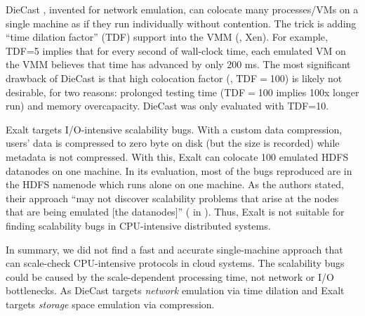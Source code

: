 %
DieCast \cite{Gupta+08-DieCast}, invented for network emulation, can colocate
many processes/VMs on a single machine as if they run individually without
contention.  The trick is adding ``time dilation factor'' (TDF) support
\cite{Gupta+06-TimeDilation} into the VMM (\eg, Xen).
%
For example, TDF=5 implies that for every second of wall-clock time, each
emulated VM on the VMM believes that time has advanced by only 200 ms.
%
The most significant drawback of DieCast is that high colocation factor (\eg,
TDF$=$100) is likely not desirable, for two reasons: prolonged testing time
(TDF$=$100 implies 100x longer run) and memory overcapacity.  DieCast was only
evaluated with TDF=10.


Exalt \cite{Wang+14-Exalt} targets I/O-intensive scalability bugs.  With a
custom data compression, users' data is compressed to zero byte on disk (but the
size is recorded) while metadata is not compressed.  With this, Exalt can
colocate 100 emulated HDFS datanodes on one machine.  In its evaluation, most
of the bugs reproduced are in the HDFS namenode which runs alone on one machine.
As the authors stated, their approach ``may not discover scalability problems
that arise at the nodes that are being emulated [the datanodes]'' ( in
\cite{Wang+14-Exalt}). Thus, Exalt is not suitable for finding scalability bugs
in CPU-intensive distributed systems. 



In summary, we did not find a fast and accurate single-machine approach that can
scale-check CPU-intensive protocols in cloud systems.
%
The scalability bugs could be caused by the scale-dependent processing time, not
network or I/O bottlenecks. As DieCast targets {\em network} emulation via time
dilation and Exalt targets {\em storage} space emulation via compression. 

